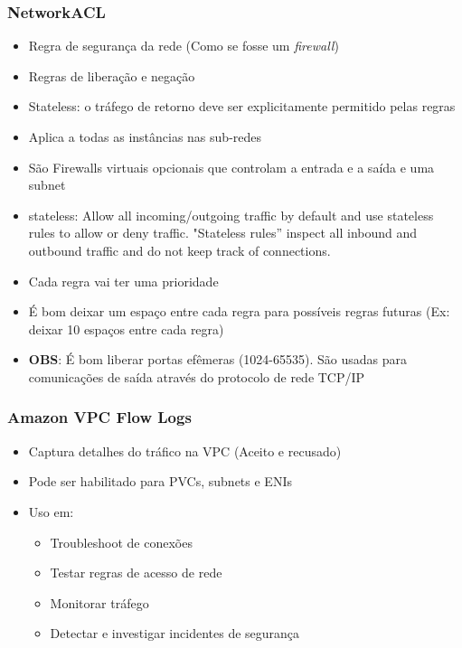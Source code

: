 \begin{frame}[allowframebreaks]
	\frametitle{NetworkACL}
	\begin{itemize}
		\item Regra de segurança da rede (Como se fosse um \textit{firewall})
		\item Regras de liberação e negação
		\item Stateless: o tráfego de retorno deve ser explicitamente permitido pelas regras
		\item Aplica a todas as instâncias nas sub-redes
		\item São Firewalls virtuais opcionais que controlam a entrada e a saída e uma subnet
		\item stateless: Allow all incoming/outgoing traffic by default and use stateless rules to allow or deny traffic. "Stateless rules” inspect all inbound and outbound traffic and do not keep track of connections.
		\item Cada regra vai ter uma prioridade
		\item É bom deixar um espaço entre cada regra para possíveis regras futuras (Ex: deixar 10 espaços entre cada regra)
		\item \textbf{OBS}: É bom liberar portas efêmeras (1024-65535). São usadas para comunicações de saída através do protocolo de rede TCP/IP
	\end{itemize}
\end{frame}

\begin{frame}
	\frametitle{Amazon VPC Flow Logs}
	\begin{itemize}
		\item Captura detalhes do tráfico na VPC (Aceito e recusado)
		\item Pode ser habilitado para PVCs, subnets e ENIs
		\item Uso em:
			\begin{itemize}
				\item Troubleshoot de conexões
				\item Testar regras de acesso de rede
				\item Monitorar tráfego
				\item Detectar e investigar incidentes de segurança
			\end{itemize}
	\end{itemize}
\end{frame}

